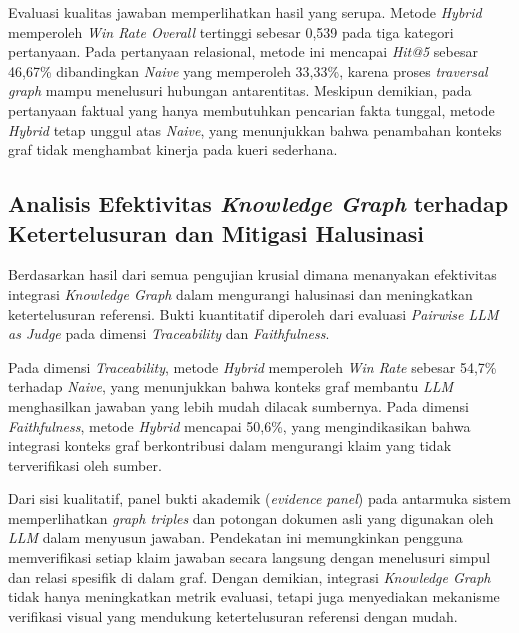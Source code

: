Evaluasi kualitas jawaban memperlihatkan hasil yang serupa. Metode \textit{Hybrid} memperoleh \textit{Win Rate Overall} tertinggi sebesar 0,539 pada tiga kategori pertanyaan. Pada pertanyaan relasional, metode ini mencapai \textit{Hit@5} sebesar 46,67\% dibandingkan \textit{Naive} yang memperoleh 33,33\%, karena proses \textit{traversal graph} mampu menelusuri hubungan antarentitas. Meskipun demikian, pada pertanyaan faktual yang hanya membutuhkan pencarian fakta tunggal, metode \textit{Hybrid} tetap unggul atas \textit{Naive}, yang menunjukkan bahwa penambahan konteks graf tidak menghambat kinerja pada kueri sederhana.

\subsection{Analisis Efektivitas \textit{Knowledge Graph} terhadap Ketertelusuran dan Mitigasi Halusinasi}

Berdasarkan hasil dari semua pengujian krusial dimana menanyakan efektivitas integrasi \textit{Knowledge Graph} dalam mengurangi halusinasi dan meningkatkan ketertelusuran referensi. Bukti kuantitatif diperoleh dari evaluasi \textit{Pairwise LLM as Judge} pada dimensi \textit{Traceability} dan \textit{Faithfulness}.

Pada dimensi \textit{Traceability}, metode \textit{Hybrid} memperoleh \textit{Win Rate} sebesar 54,7\% terhadap \textit{Naive}, yang menunjukkan bahwa konteks graf membantu \textit{LLM} menghasilkan jawaban yang lebih mudah dilacak sumbernya. Pada dimensi \textit{Faithfulness}, metode \textit{Hybrid} mencapai 50,6\%, yang mengindikasikan bahwa integrasi konteks graf berkontribusi dalam mengurangi klaim yang tidak terverifikasi oleh sumber.

Dari sisi kualitatif, panel bukti akademik (\textit{evidence panel}) pada antarmuka sistem memperlihatkan \textit{graph triples} dan potongan dokumen asli yang digunakan oleh \textit{LLM} dalam menyusun jawaban. Pendekatan ini memungkinkan pengguna memverifikasi setiap klaim jawaban secara langsung dengan menelusuri simpul dan relasi spesifik di dalam graf. Dengan demikian, integrasi \textit{Knowledge Graph} tidak hanya meningkatkan metrik evaluasi, tetapi juga menyediakan mekanisme verifikasi visual yang mendukung ketertelusuran referensi dengan mudah.
